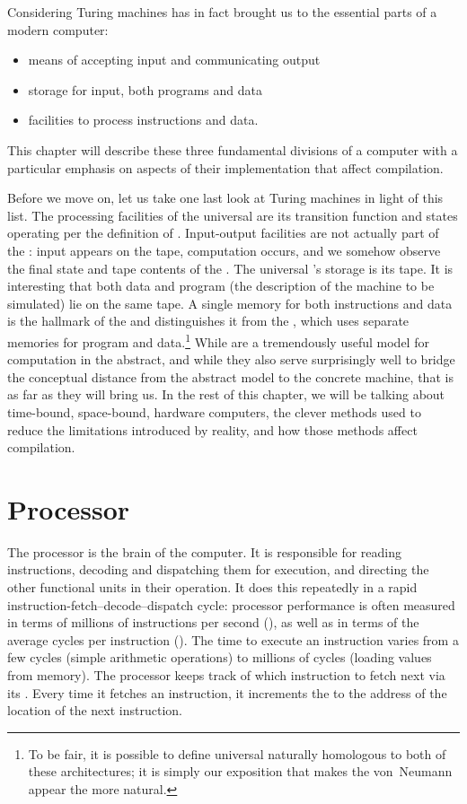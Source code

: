Considering Turing machines has in fact brought us to the essential parts of a modern computer:
\begin{itemize}
\item means of accepting input and communicating output
\item storage for input, both programs and data
\item facilities to process instructions and data.
\end{itemize}
This chapter will describe these three fundamental divisions of a computer with a particular emphasis on aspects of their implementation that affect compilation.

Before we move on, let us take one last look at Turing machines in light of this list. The processing facilities of the universal \TM are its transition function and states operating per the definition of \TMs. Input-output facilities are not actually part of the \TM: input appears on the tape, computation occurs, and we somehow observe the final state and tape contents of the \TM. The universal \TM's storage is its tape. It is interesting that both data and program (the description of the machine to be simulated) lie on the same tape. A single memory for both instructions and data is the hallmark of the  and distinguishes it from the , which uses separate memories for program and data.\footnote{To be fair, it is possible to define universal \TMs naturally homologous to both of these architectures; it is simply our exposition that makes the von~Neumann appear the more natural.} While \TMs are a tremendously useful model for computation in the abstract, and while they also serve surprisingly well to bridge the conceptual distance from the abstract model to the concrete machine, that is as far as they will bring us. In the rest of this chapter, we will be talking about time-bound, space-bound, hardware computers, the clever methods used to reduce the limitations introduced by reality, and how those methods affect compilation.

\section{Processor}\label{background:computers:processor}
The processor is the brain of the computer. It is responsible for reading instructions, decoding and dispatching them for execution, and directing the other functional units in their operation. It does this repeatedly in a rapid instruction-fetch--decode--dispatch cycle: processor performance is often measured in terms of millions of instructions per second (), as well as in terms of the average cycles per instruction (). The time to execute an instruction varies from a few cycles (simple arithmetic operations) to millions of cycles (loading values from memory). The processor keeps track of which instruction to fetch next via its . Every time it fetches an instruction, it increments the  to the address of the location of the next instruction.

